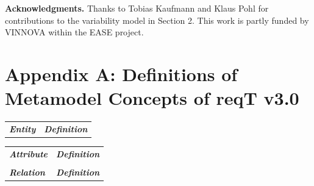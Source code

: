 \documentclass[a4paper]{llncs}
\begin{document}
\vspace{0.2cm}
{\small\noindent\textbf{Acknowledgments.} Thanks to Tobias Kaufmann and Klaus Pohl for contributions to the variability model in Section 2. This work is partly funded by  VINNOVA within the EASE project. }




\clearpage
\section*{Appendix A: Definitions of Metamodel Concepts of reqT v3.0}
\begin{minipage}{1\linewidth}
\begin{minipage}{0.30\textwidth} 

\begin{table}[H]
\vspace{-1.0cm}
\fontsize{6}{6.5}\selectfont

\begin{tabular}{l p{4.6cm}}

\textbf{\textit{Entity}} & \textbf{\textit{Definition}}  \\

 \end{tabular}
\end{table}
\end{minipage}
 \hspace{4em plus 1fill} 
\begin{minipage}{0.46\textwidth} 
 \begin{table}[H]
\fontsize{6}{6.5}\selectfont
\vspace{-1.0cm}
\label{table-entities}
\begin{tabular}{|l p{4.1cm}}
 
\textbf{\textit{Attribute}} & \textbf{\textit{Definition}}  \\ 

 & \\
 \textbf{\textit{Relation}} & \textbf{\textit{Definition}}  \\ 


\end{tabular}
\end{table}

\end{minipage}
\end{minipage}
\end{document}
